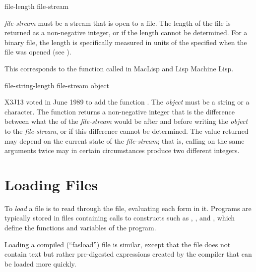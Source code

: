 \begin{defun}[Function]
file-length file-stream

{\it file-stream} must be a stream that is open to a file.
The length of the file is returned as a non-negative integer,
or {\false} if the length cannot be determined.
For a binary file,
the length is specifically
measured in units of the  specified
when the file was opened (see ).

\beforenoterule
\begin{incompatibility}
This corresponds to the function
called  in MacLisp and Lisp Machine Lisp.
\end{incompatibility}
\afternoterule
\end{defun}


\begin{newer}
\begin{defun}[Function]
file-string-length file-stream object

X3J13 voted in June 1989  to add
the function .
The {\it object} must be a string or a character.  The function
 returns a non-negative integer
that is the difference between what the  of the
{\it file-stream} would be after and before writing the {\it object}
to the {\it file-stream}, or  if this
difference cannot be determined.  The value returned may
depend on the current state of the {\it file-stream}; that is, calling
 on the same arguments twice may in certain circumstances
produce two different integers.
\end{defun}
\end{newer}

\section{Loading Files}

To {\it load} a file is to read through the file, evaluating each form in
it.  Programs are typically stored in files containing calls to
constructs such as , ,
and , which define
the functions and variables of the program.

Loading a compiled (``fasload'') file is similar, except that the file does not
contain text but rather pre-digested expressions created by the
compiler that can be loaded more quickly.

